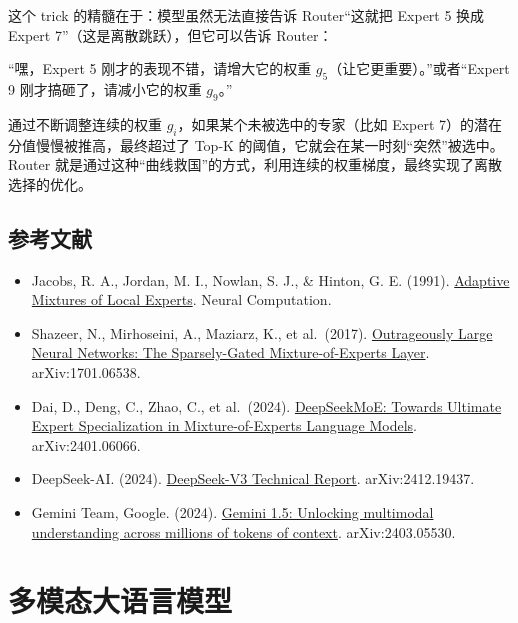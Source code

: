 这个 trick 的精髓在于：模型虽然无法直接告诉 Router``这就把 Expert 5 换成 Expert 7''（这是离散跳跃），但它可以告诉 Router：

``嘿，Expert 5 刚才的表现不错，请增大它的权重 \(g_5\)（让它更重要）。''或者``Expert 9 刚才搞砸了，请减小它的权重 \(g_9\)。''

通过不断调整连续的权重 \(g_i\)，如果某个未被选中的专家（比如 Expert 7）的潜在分值慢慢被推高，最终超过了 Top-K 的阈值，它就会在某一时刻``突然''被选中。Router 就是通过这种``曲线救国''的方式，利用连续的权重梯度，最终实现了离散选择的优化。

\hypertarget{ux53c2ux8003ux6587ux732e-77}{%
\subsection{参考文献}\label{ux53c2ux8003ux6587ux732e-77}}

\vspace{0.25em}
\begin{itemize}
\tightlist
\item
  Jacobs, R. A., Jordan, M. I., Nowlan, S. J., \& Hinton, G. E. (1991). \href{https://doi.org/10.1162/neco.1991.3.1.79}{Adaptive Mixtures of Local Experts}. Neural Computation.
\item
  Shazeer, N., Mirhoseini, A., Maziarz, K., et al.~(2017). \href{https://arxiv.org/abs/1701.06538}{Outrageously Large Neural Networks: The Sparsely-Gated Mixture-of-Experts Layer}. arXiv:1701.06538.
\item
  Dai, D., Deng, C., Zhao, C., et al.~(2024). \href{https://arxiv.org/abs/2401.06066}{DeepSeekMoE: Towards Ultimate Expert Specialization in Mixture-of-Experts Language Models}. arXiv:2401.06066.
\item
  DeepSeek-AI. (2024). \href{https://arxiv.org/abs/2412.19437}{DeepSeek-V3 Technical Report}. arXiv:2412.19437.
\item
  Gemini Team, Google. (2024). \href{https://arxiv.org/abs/2403.05530}{Gemini 1.5: Unlocking multimodal understanding across millions of tokens of context}. arXiv:2403.05530.
\end{itemize}

\clearpage

\hypertarget{ux591aux6a21ux6001ux5927ux8bedux8a00ux6a21ux578b}{%
\section{多模态大语言模型}\label{ux591aux6a21ux6001ux5927ux8bedux8a00ux6a21ux578b}}

